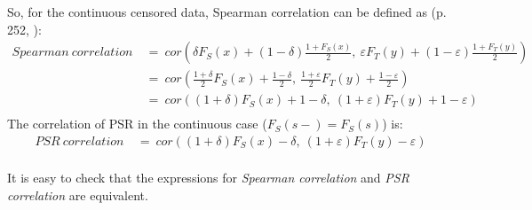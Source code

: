 \documentclass[]{article}
\let\epsilon\varepsilon
\begin{document}
So, for the continuous censored data, Spearman correlation can be defined as (p. 252, \cite{dabrowska1986rank}):
	$$
	\begin{aligned}
		Spearman~correlation~&=~ cor\left(  \delta F_S(x) + (1-\delta) \frac{1+F_S(x)}{2},~\epsilon F_T(y) + (1-\epsilon) \frac{1+F_T(y)}{2}  \right)\\
		&=~ cor\left(  \frac{1+\delta}{2}F_S(x) +  \frac{1-\delta}{2},~\frac{1+\epsilon}{2}F_T(y) +  \frac{1-\epsilon}{2}  \right)\\
		&=~ cor\left(  (1+\delta)F_S(x) +  1-\delta,~(1+\epsilon)F_T(y) +  1-\epsilon  \right)\\
	\end{aligned}
	$$
The correlation of PSR in the continuous case ($F_S(s-) = F_S(s)$) is:
	$$
	\begin{aligned}
		PSR~correlation~&=~ cor\left(  (1+\delta)F_S(x) -\delta,~(1+\epsilon)F_T(y) -\epsilon  \right)\\
	\end{aligned}
	$$

It is easy to check that the expressions for \emph{Spearman correlation} and \emph{PSR correlation} are equivalent.
	
\end{document}

